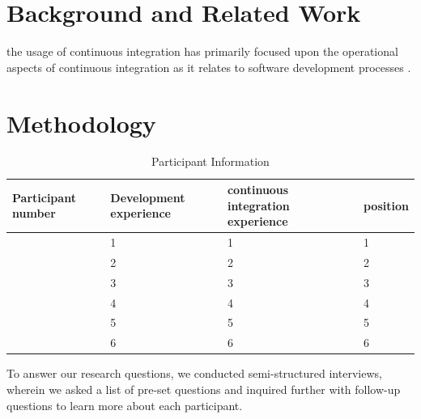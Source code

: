 \documentclass{sig-alternate}
\begin{document}
\section{Background and Related Work}

the usage of continuous integration has primarily focused upon the operational aspects of continuous integration as it relates to software development processes \cite{miller:hundreddays}\cite{olsson:climbingstairway}.

\section{Methodology} \label{method}

\begin{table}[b]
	\centering
	\label{table:participant}
	\caption{Participant Information}
	\begin{tabular}{ | p{} | p{} | p{} | p{} | }\hline
		Participant number & Development experience & continuous integration experience & position \\ \hline
		\michael & 1 & 1 & 1 \\ \hline
		\sruti & 2 & 2 & 2 \\ \hline
		\caius & 3 & 3 & 3 \\ \hline
		\srutitwo & 4 & 4 & 4 \\ \hline
		\david & 5 & 5 & 5 \\ \hline
		\cpg & 6 & 6 & 6 \\ \hline
	\end{tabular}
\end{table}
To answer our research questions, we conducted semi-structured interviews, wherein we asked a list of pre-set questions and inquired further with follow-up questions to learn more about each participant. \\
\end{document}

